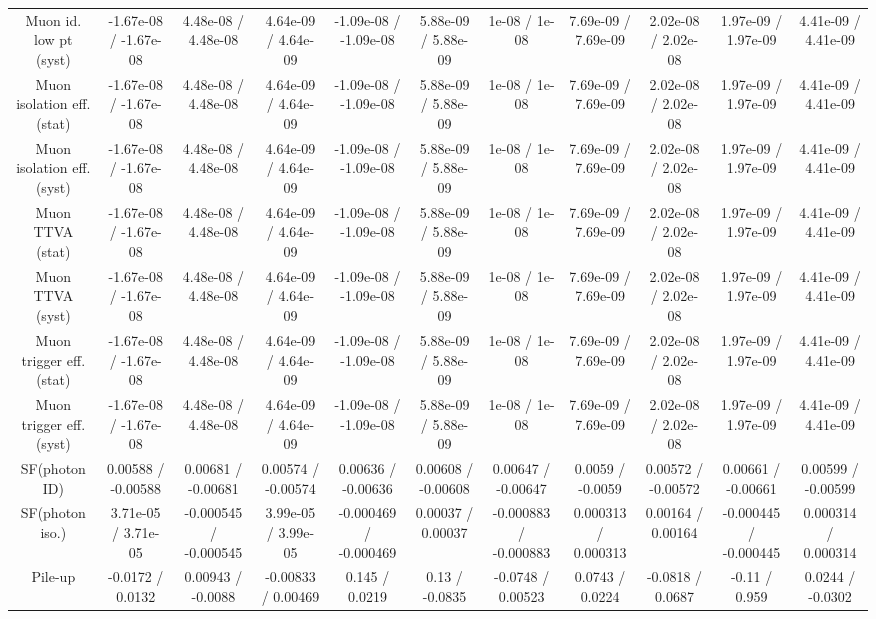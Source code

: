 \begin{table}[htbp]
\begin{center}
\begin{tabular}{|c|c|c|c|c|c|c|c|c|c|c|}
  Muon id. low pt (syst) & -1.67e-08 / -1.67e-08 & 4.48e-08 / 4.48e-08 & 4.64e-09 / 4.64e-09 & -1.09e-08 / -1.09e-08 & 5.88e-09 / 5.88e-09 & 1e-08 / 1e-08 & 7.69e-09 / 7.69e-09 & 2.02e-08 / 2.02e-08 & 1.97e-09 / 1.97e-09 & 4.41e-09 / 4.41e-09 \\ 
  Muon isolation eff. (stat) & -1.67e-08 / -1.67e-08 & 4.48e-08 / 4.48e-08 & 4.64e-09 / 4.64e-09 & -1.09e-08 / -1.09e-08 & 5.88e-09 / 5.88e-09 & 1e-08 / 1e-08 & 7.69e-09 / 7.69e-09 & 2.02e-08 / 2.02e-08 & 1.97e-09 / 1.97e-09 & 4.41e-09 / 4.41e-09 \\ 
  Muon isolation eff. (syst) & -1.67e-08 / -1.67e-08 & 4.48e-08 / 4.48e-08 & 4.64e-09 / 4.64e-09 & -1.09e-08 / -1.09e-08 & 5.88e-09 / 5.88e-09 & 1e-08 / 1e-08 & 7.69e-09 / 7.69e-09 & 2.02e-08 / 2.02e-08 & 1.97e-09 / 1.97e-09 & 4.41e-09 / 4.41e-09 \\ 
  Muon TTVA (stat) & -1.67e-08 / -1.67e-08 & 4.48e-08 / 4.48e-08 & 4.64e-09 / 4.64e-09 & -1.09e-08 / -1.09e-08 & 5.88e-09 / 5.88e-09 & 1e-08 / 1e-08 & 7.69e-09 / 7.69e-09 & 2.02e-08 / 2.02e-08 & 1.97e-09 / 1.97e-09 & 4.41e-09 / 4.41e-09 \\ 
  Muon TTVA (syst) & -1.67e-08 / -1.67e-08 & 4.48e-08 / 4.48e-08 & 4.64e-09 / 4.64e-09 & -1.09e-08 / -1.09e-08 & 5.88e-09 / 5.88e-09 & 1e-08 / 1e-08 & 7.69e-09 / 7.69e-09 & 2.02e-08 / 2.02e-08 & 1.97e-09 / 1.97e-09 & 4.41e-09 / 4.41e-09 \\ 
  Muon trigger eff. (stat) & -1.67e-08 / -1.67e-08 & 4.48e-08 / 4.48e-08 & 4.64e-09 / 4.64e-09 & -1.09e-08 / -1.09e-08 & 5.88e-09 / 5.88e-09 & 1e-08 / 1e-08 & 7.69e-09 / 7.69e-09 & 2.02e-08 / 2.02e-08 & 1.97e-09 / 1.97e-09 & 4.41e-09 / 4.41e-09 \\ 
  Muon trigger eff. (syst) & -1.67e-08 / -1.67e-08 & 4.48e-08 / 4.48e-08 & 4.64e-09 / 4.64e-09 & -1.09e-08 / -1.09e-08 & 5.88e-09 / 5.88e-09 & 1e-08 / 1e-08 & 7.69e-09 / 7.69e-09 & 2.02e-08 / 2.02e-08 & 1.97e-09 / 1.97e-09 & 4.41e-09 / 4.41e-09 \\ 
  SF(photon ID) & 0.00588 / -0.00588 & 0.00681 / -0.00681 & 0.00574 / -0.00574 & 0.00636 / -0.00636 & 0.00608 / -0.00608 & 0.00647 / -0.00647 & 0.0059 / -0.0059 & 0.00572 / -0.00572 & 0.00661 / -0.00661 & 0.00599 / -0.00599 \\ 
  SF(photon iso.) & 3.71e-05 / 3.71e-05 & -0.000545 / -0.000545 & 3.99e-05 / 3.99e-05 & -0.000469 / -0.000469 & 0.00037 / 0.00037 & -0.000883 / -0.000883 & 0.000313 / 0.000313 & 0.00164 / 0.00164 & -0.000445 / -0.000445 & 0.000314 / 0.000314 \\ 
  Pile-up & -0.0172 / 0.0132 & 0.00943 / -0.0088 & -0.00833 / 0.00469 & 0.145 / 0.0219 & 0.13 / -0.0835 & -0.0748 / 0.00523 & 0.0743 / 0.0224 & -0.0818 / 0.0687 & -0.11 / 0.959 & 0.0244 / -0.0302 \\ 

\end{tabular}
\end{center}
\end{table}
